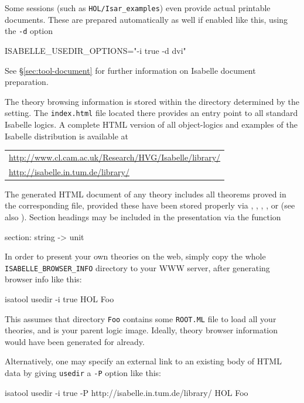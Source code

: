 Some sessions (such as \texttt{HOL/Isar_examples}) even provide actual
printable documents.  These are prepared automatically as well if enabled like
this, using the \texttt{-d} option
\begin{ttbox}
ISABELLE_USEDIR_OPTIONS="-i true -d dvi"
\end{ttbox}
See \S\ref{sec:tool-document} for further information on Isabelle document
preparation.

\bigskip The theory browsing information is stored within the directory
determined by the  setting.  The
\texttt{index.html} file located there provides an entry point to all standard
Isabelle logics.  A complete HTML version of all object-logics and examples of
the Isabelle distribution is available at
\begin{center}\small
  \begin{tabular}{l}
    \url{http://www.cl.cam.ac.uk/Research/HVG/Isabelle/library/} \\
    \url{http://isabelle.in.tum.de/library/} \\
  \end{tabular}
\end{center}

\medskip

The generated HTML document of any theory includes all theorems proved in the
corresponding {\ML} file, provided these have been stored properly via
, , , ,
 or  (see also \cite{isabelle-ref}).
Section headings may be included in the presentation via the {\ML} function
\begin{ttbox}
section: string -> unit
\end{ttbox}

\medskip

In order to present your own theories on the web, simply copy the whole
\texttt{ISABELLE_BROWSER_INFO} directory to your WWW server, after generating
browser info like this:
\begin{ttbox}
isatool usedir -i true HOL Foo
\end{ttbox}
This assumes that directory \texttt{Foo} contains some \texttt{ROOT.ML} file
to load all your theories, and {\HOL} is your parent logic image.  Ideally,
theory browser information would have been generated for {\HOL} already.

Alternatively, one may specify an external link to an existing body of HTML
data by giving \texttt{usedir} a \texttt{-P} option like this:
\begin{ttbox}
isatool usedir -i true -P http://isabelle.in.tum.de/library/ HOL Foo
\end{ttbox}

